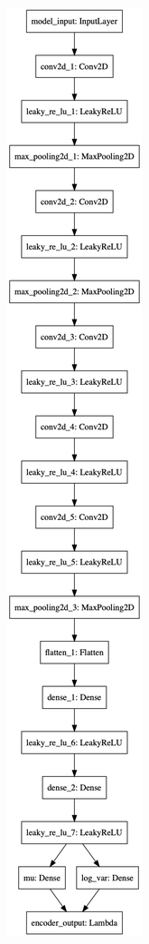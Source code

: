 \begin{figure}
    \centering
    \begin{subfigure}{.5\textwidth}
        \centering
        \includegraphics[width=\textwidth,height=.9\textheight,keepaspectratio]{alexnet-vae/encoder.png}

\end{subfigure}
\end{figure}
